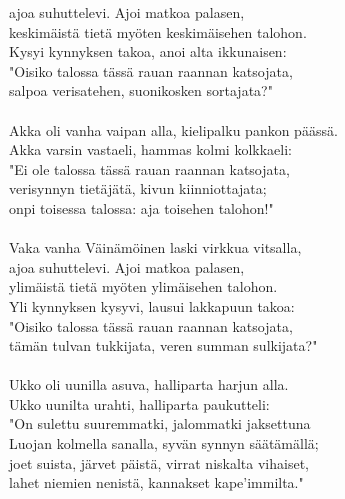 ajoa suhuttelevi. Ajoi matkoa palasen,                          \\
keskimäistä tietä myöten keskimäisehen talohon.                 \\
Kysyi kynnyksen takoa, anoi alta ikkunaisen:                    \\
"Oisiko talossa tässä rauan raannan katsojata,                  \\
salpoa verisatehen, suonikosken sortajata?"                     \\
                                                                \\
Akka oli vanha vaipan alla, kielipalku pankon päässä.           \\
Akka varsin vastaeli, hammas kolmi kolkkaeli:                   \\
"Ei ole talossa tässä rauan raannan katsojata,                  \\
verisynnyn tietäjätä, kivun kiinniottajata;                     \\
onpi toisessa talossa: aja toisehen talohon!"                   \\
                                                                \\
Vaka vanha Väinämöinen laski virkkua vitsalla,                  \\
ajoa suhuttelevi. Ajoi matkoa palasen,                          \\
ylimäistä tietä myöten ylimäisehen talohon.                     \\
Yli kynnyksen kysyvi, lausui lakkapuun takoa:                   \\
"Oisiko talossa tässä rauan raannan katsojata,                  \\
tämän tulvan tukkijata, veren summan sulkijata?"                \\
                                                                \\
Ukko oli uunilla asuva, halliparta harjun alla.                 \\
Ukko uunilta urahti, halliparta paukutteli:                     \\
"On sulettu suuremmatki, jalommatki jaksettuna                  \\
Luojan kolmella sanalla, syvän synnyn säätämällä;               \\
joet suista, järvet päistä, virrat niskalta vihaiset,           \\
lahet niemien nenistä, kannakset kape'immilta."                 \\